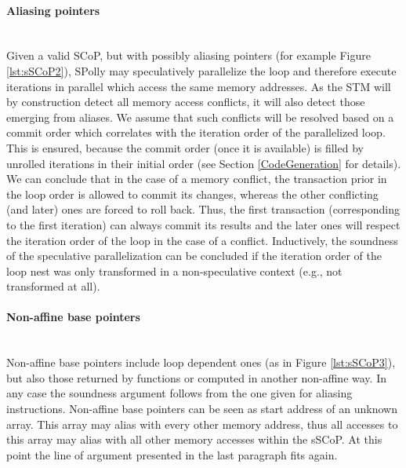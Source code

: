 \paragraph{Aliasing pointers} ~\\
Given a valid SCoP, but with possibly aliasing pointers 
(for example Figure \ref{lst:sSCoP2}), 
SPolly may speculatively parallelize the loop and therefore execute iterations in 
parallel which access the same memory addresses. 
As the STM will by construction detect all memory access conflicts,
it will also detect those emerging from aliases.
We assume that such conflicts will be resolved based on a commit order which
correlates with the iteration order of the parallelized loop. 
This is ensured, because the commit order 
(once it is available) is filled by unrolled iterations 
in their initial order (see Section \ref{CodeGeneration} for details).
We can conclude that in the case of a memory conflict, 
the transaction prior in the loop order is allowed to commit its
changes, whereas the other conflicting (and later) ones are forced to roll back.
Thus, the first transaction (corresponding to the first iteration)
can always commit its results and the later ones 
will respect the iteration order of the loop in the case of a conflict. 
Inductively, the soundness of the speculative parallelization can be concluded
if the iteration order of the loop nest was only transformed in a non-speculative 
context (e.g., not transformed at all). 


\paragraph{Non-affine base pointers} ~\\
Non-affine base pointers include loop dependent ones (as in Figure \ref{lst:sSCoP3}),
but also those returned by functions or computed in another non-affine way. 
In any case the soundness argument follows from the one given for 
aliasing instructions. Non-affine base pointers can be seen as start address of
an unknown array. This array may alias with every other memory address, thus
all accesses to this array may alias with all other memory accesses within the 
sSCoP. At this point the line of argument presented in the last paragraph 
fits again. 

